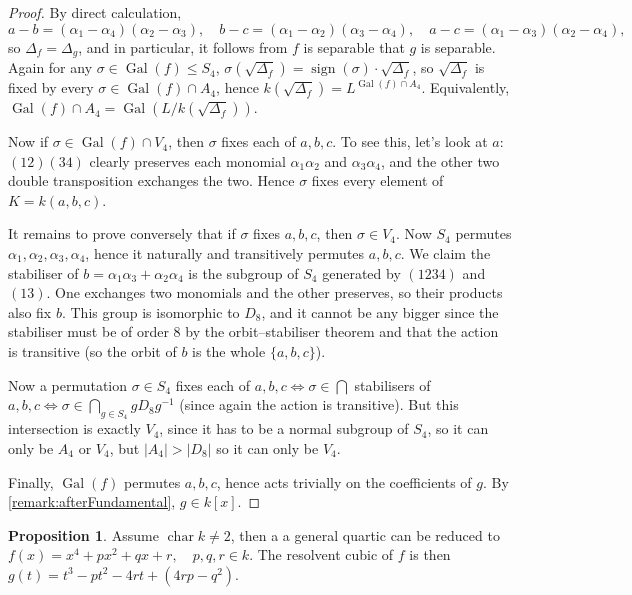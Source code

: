 \documentclass{article}
\newcommand{\Char}{\operatorname{char}}
\newcommand{\Gal}{\operatorname{Gal}}
\newcommand{\sign}{\operatorname{sign}}
\theoremstyle{definition}
\newtheorem{prop}[defn]{Proposition}
\begin{document}
\begin{proof}
By direct calculation,
\[
a-b=(\alpha_1-\alpha_4)(\alpha_2-\alpha_3),\quad b-c=(\alpha_1-\alpha_2)(\alpha_3-\alpha_4),\quad a-c=(\alpha_1-\alpha_3)(\alpha_2-\alpha_4),
\]
so $\Delta_f=\Delta_g$, and in particular, it follows from $f$ is separable that $g$ is separable. Again for any $\sigma\in\Gal(f)\leq S_4$, $\sigma\left(\sqrt{\Delta_f}\right)=\sign(\sigma)\cdot\sqrt{\Delta_f}$, so $\sqrt{\Delta_f}$ is fixed by every $\sigma\in\Gal(f)\cap A_4$, hence $k\left(\sqrt{\Delta_f}\right)=L^{\Gal(f)\cap A_4}$. Equivalently, $\Gal(f)\cap A_4=\Gal\left(L/k\left(\sqrt{\Delta_f}\right)\right)$.

Now if $\sigma\in\Gal(f)\cap V_4$, then $\sigma$ fixes each of $a,b,c$. To see this, let's look at $a$: $(12)(34)$ clearly preserves each monomial $\alpha_1\alpha_2$ and $\alpha_3\alpha_4$, and the other two double transposition exchanges the two. Hence $\sigma$ fixes every element of $K=k(a,b,c)$.

It remains to prove conversely that if $\sigma$ fixes $a,b,c$, then $\sigma\in V_4$. Now $S_4$ permutes $\alpha_1,\alpha_2,\alpha_3,\alpha_4$, hence it naturally and transitively permutes $a,b,c$. We claim the stabiliser of $b=\alpha_1\alpha_3+\alpha_2\alpha_4$ is the subgroup of $S_4$ generated by $(1234)$ and $(13)$. One exchanges two monomials and the other preserves, so their products also fix $b$. This group is isomorphic to $D_8$, and it cannot be any bigger since the stabiliser must be of order 8 by the orbit--stabiliser theorem and that the action is transitive (so the orbit of $b$ is the whole $\{a,b,c\}$).

Now a permutation $\sigma\in S_4$ fixes each of $a,b,c\iff\sigma\in\bigcap$ stabilisers of $a,b,c\iff\sigma\in\bigcap_{g\in S_4}gD_8g^{-1}$ (since again the action is transitive). But this intersection is exactly $V_4$, since it has to be a normal subgroup of $S_4$, so it can only be $A_4$ or $V_4$, but $|A_4|>|D_8|$ so it can only be $V_4$.

Finally, $\Gal(f)$ permutes $a,b,c$, hence acts trivially on the coefficients of $g$. By \ref{remark:afterFundamental}, $g\in k[x]$.
\end{proof}

\begin{prop}
Assume $\Char k\neq 2$, then a a general quartic can be reduced to $f(x)=x^4+px^2+qx+r,\quad p,q,r\in k$. The resolvent cubic of $f$ is then $g(t)=t^3-pt^2-4rt+(4rp-q^2)$.
\end{prop}
\end{document}
